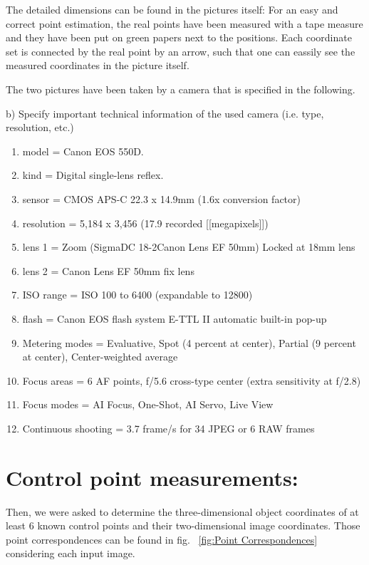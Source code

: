 \documentclass[a4paper,headings=small]{scrartcl}
\numberwithin{equation}{section} %
\numberwithin{figure}{section}   %
\begin{document}
The detailed dimensions can be found in the pictures itself:
For an easy and correct point estimation, the real points have been measured with a tape measure
and they have been put on green papers next to the positions.
Each coordinate set is connected by the real point by an arrow,
such that one can eassily see the measured coordinates in the picture itself.

The two pictures have been taken by a camera that is specified in the following.

b) Specify important technical information of the used camera
(i.e. type, resolution, etc.)

\begin{enumerate}
       \item model               = Canon EOS 550D.
       \item kind                = Digital single-lens reflex.
       \item sensor              = CMOS APS-C 22.3 x 14.9mm (1.6x conversion factor)
       \item resolution          = 5,184 x 3,456 (17.9 recorded [[megapixels]])
       \item lens 1              = Zoom (SigmaDC 18-2Canon Lens EF 50mm) Locked at 18mm lens
       \item lens 2              = Canon Lens EF 50mm fix lens
       \item ISO range           = ISO 100 to 6400 (expandable to 12800)
       \item flash               = Canon EOS flash system E-TTL II automatic built-in pop-up
       \item Metering modes      = Evaluative, Spot (4 percent at center), Partial (9 percent at center), Center-weighted average
       \item Focus areas         = 6 AF points, f/5.6 cross-type center (extra sensitivity at f/2.8)
       \item Focus modes 	 = AI Focus, One-Shot, AI Servo, Live View
       \item Continuous shooting = 3.7 frame/s for 34 JPEG or 6 RAW frames
\end{enumerate}

\section{Control point measurements:}

Then, we were asked to determine the three-dimensional object coordinates of at least 6 known
control points and their two-dimensional image coordinates. 
Those point correspondences can be found in fig. ~\ref{fig:Point Correspondences}
considering each input image.
\end{document}
